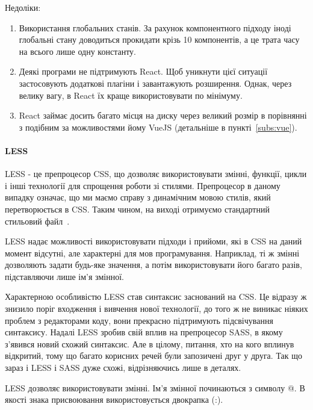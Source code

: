 Недоліки:
\begin{enumerate}
    \item Використання глобальних станів. За рахунок компонентного підходу іноді глобальні стану доводиться прокидати крізь 10 компонентів, а це трата часу на всього лише одну константу. 
    \item Деякі програми не підтримують React. Щоб уникнути цієї ситуації застосовують додаткові плагіни і завантажують розширення. Однак, через велику вагу, в React їх краще використовувати по мінімуму. 
    \item React займає досить багато місця на диску через великий розмір в порівнянні з подібним за можливостями йому VueJS (детальніше в пункті~\ref{subs:vue}).
\end{enumerate}

\paragraph{LESS}

LESS - це препроцесор CSS, що дозволяє використовувати змінні, функції, цикли і інші технології для спрощення роботи зі стилями. Препроцесор в даному випадку означає, що ми маємо справу з динамічним мовою стилів, який перетворюється в CSS. Таким чином, на виході отримуємо стандартний стильовий файл~\cite{9781782160663}.

LESS надає можливості використовувати підходи і прийоми, які в CSS на даний момент відсутні, але характерні для мов програмування. Наприклад, ті ж змінні дозволяють задати будь-яке значення, а потім використовувати його багато разів, підставляючи лише ім'я змінної.

Характерною особливістю LESS став синтаксис заснований на CSS. Це відразу ж знизило поріг входження і вивчення нової технології, до того ж не виникає ніяких проблем з редакторами коду, вони прекрасно підтримують підсвічування синтаксису. Надалі LESS зробив свій вплив на препроцесор SASS, в якому з'явився новий схожий синтаксис. Але в цілому, питання, хто на кого вплинув відкритий, тому що багато корисних речей були запозичені друг у друга. Так що зараз і LESS і SASS дуже схожі, відрізняючись лише в деталях.

LESS дозволяє використовувати змінні. Ім'я змінної починаються з символу @. В якості знака присвоювання використовується двокрапка (:).


